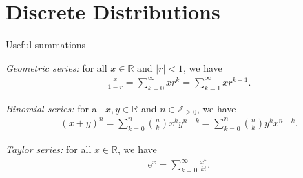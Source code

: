 \documentclass[8pt, handout]{beamer}
\renewcommand{\emph}[1]{\textcolor{defcol}{\textsl{#1}}}
\begin{document}
\section{Discrete Distributions}

\begin{frame}{Useful summations}

    \emph{Geometric series:} for all \(x \in \mathbb{R}\) and \(|r| < 1\), we have
    \begin{align*}
        \frac{x}{1 - r} = \sum_{k=0}^{\infty} x r^k = \sum_{k=1}^{\infty} x r^{k-1}.
    \end{align*}

    \emph{Binomial series:} for all \(x,y\in\mathbb{R}\) and \(n \in \mathbb{Z}_{\ge0}\), we have 
    \begin{align*}
        (x + y)^n = \sum_{k=0}^n \binom{n}{k} x^k y^{n - k} = \sum_{k=0}^n \binom{n}{k} y^k x^{n - k}.
    \end{align*}

    \emph{Taylor series:} for all \(x \in \mathbb{R}\), we have
    \begin{align*}
        \mathrm{e}^x = \sum_{k=0}^{\infty} \frac{x^k}{k!}.
    \end{align*}

\end{frame}
\end{document}
